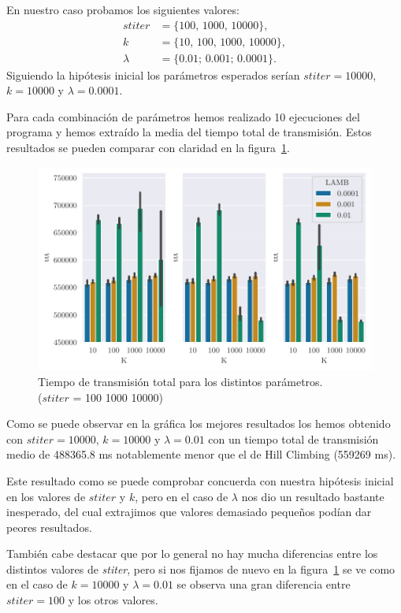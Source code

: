 En nuestro caso probamos los siguientes valores:
\begin{align*}
stiter&=\{100,\,1000,\,10000\},\\
k&=\{10,\,100,\,1000,\,10000\},\\
\lambda&=\{0.01;\,0.001;\,0.0001\}.
\end{align*}
Siguiendo la hipótesis inicial los parámetros esperados serían $stiter=10000$, $k=10000$ y $\lambda=0.0001$.

Para cada combinación de parámetros hemos realizado 10 ejecuciones del programa y hemos extraído la media del tiempo total de transmisión. Estos resultados se pueden comparar con claridad en la figura~\ref{fig:ex3_histSA}.

\begin{figure}[H]
    \centering
    \includegraphics{include/plots/ex3_histSA.pdf}
    \caption{Tiempo de transmisión total para los distintos parámetros.\\ ($stiter$ = 100 1000 10000)}
    \label{fig:ex3_histSA}
\end{figure}

Como se puede observar en la gráfica los mejores resultados los hemos obtenido con $stiter=10000$, $k=10000$ y $\lambda=0.01$ con un tiempo total de transmisión medio de 488365.8 ms notablemente menor que el de Hill Climbing (559269 ms). 

Este resultado como se puede comprobar concuerda con nuestra hipótesis inicial en los valores de $stiter$ y $k$, pero en el caso de $\lambda$ nos dio un resultado bastante inesperado, del cual extrajimos que valores demasiado pequeños podían dar peores resultados.

También cabe destacar que por lo general no hay mucha diferencias entre los distintos valores de \emph{stiter}, pero si nos fijamos de nuevo en la figura~\ref{fig:ex3_histSA} se ve como en el caso de $k=10000$ y $\lambda=0.01$ se observa una gran diferencia entre $stiter=100$ y los otros valores.

